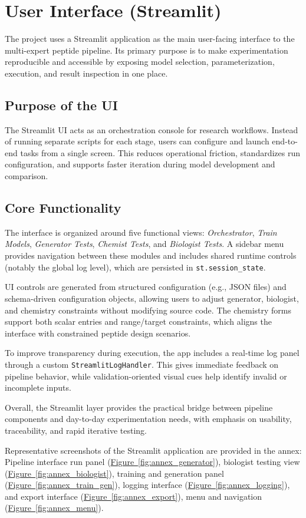 \section{User Interface (Streamlit)}\label{sec:ui}
The project uses a Streamlit application as the main user-facing interface to the multi-expert peptide pipeline. Its primary purpose is to make experimentation reproducible and accessible by exposing model selection, parameterization, execution, and result inspection in one place.

\subsection{Purpose of the UI}
The Streamlit UI acts as an orchestration console for research workflows. Instead of running separate scripts for each stage, users can configure and launch end-to-end tasks from a single screen. This reduces operational friction, standardizes run configuration, and supports faster iteration during model development and comparison.

\subsection{Core Functionality}
The interface is organized around five functional views: \textit{Orchestrator}, \textit{Train Models}, \textit{Generator Tests}, \textit{Chemist Tests}, and \textit{Biologist Tests}. A sidebar menu provides navigation between these modules and includes shared runtime controls (notably the global log level), which are persisted in \texttt{st.session\_state}.

UI controls are generated from structured configuration (e.g., JSON files) and schema-driven configuration objects, allowing users to adjust generator, biologist, and chemistry constraints without modifying source code. The chemistry forms support both scalar entries and range/target constraints, which aligns the interface with constrained peptide design scenarios.

To improve transparency during execution, the app includes a real-time log panel through a custom \texttt{StreamlitLogHandler}. This gives immediate feedback on pipeline behavior, while validation-oriented visual cues help identify invalid or incomplete inputs.

Overall, the Streamlit layer provides the practical bridge between pipeline components and day-to-day experimentation needs, with emphasis on usability, traceability, and rapid iterative testing.

Representative screenshots of the Streamlit application are provided in the annex:
Pipeline interface run panel (\hyperref[fig:annex_generator]{Figure~\ref*{fig:annex_generator}}),
biologist testing view (\hyperref[fig:annex_biologist]{Figure~\ref*{fig:annex_biologist}}), 
training and generation panel (\hyperref[fig:annex_train_gen]{Figure~\ref*{fig:annex_train_gen}}), 
logging interface (\hyperref[fig:annex_logging]{Figure~\ref*{fig:annex_logging}}), 
and export interface (\hyperref[fig:annex_export]{Figure~\ref*{fig:annex_export}}), 
menu and navigation (\hyperref[fig:annex_menu]{Figure~\ref*{fig:annex_menu}}).
